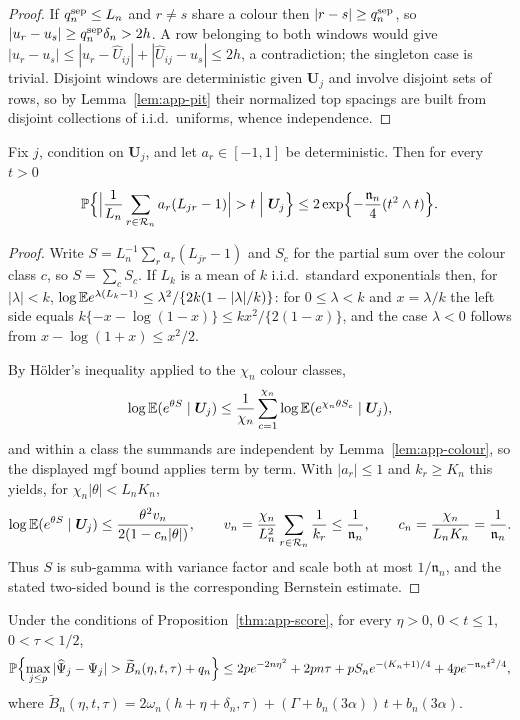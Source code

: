 \begin{proof}
If $q_n^{\rm sep}\le L_n$ and $r\ne s$ share a colour then
$|r-s|\ge q_n^{\rm sep}$, so $|u_r-u_s|\ge q_n^{\rm sep}\delta_n>2h$.
A row belonging to both windows would give
$|u_r-u_s|\le|u_r-\widehat U_{ij}|+|\widehat U_{ij}-u_s|\le2h$, a
contradiction; the singleton case is trivial.  Disjoint windows are
deterministic given $\bm U_j$ and involve disjoint sets of rows, so by
Lemma~\ref{lem:app-pit} their normalized top spacings are built from
disjoint collections of i.i.d.\ uniforms, whence independence.
\end{proof}

\begin{lemma}\label{lem:app-colourbern}
Fix $j$, condition on $\bm U_j$, and let $a_r\in[-1,1]$ be deterministic.
Then for every $t>0$
\[
 \Pp\Bigl\{\Bigl|\frac1{L_n}\sum_{r\in\mathcal R_n}a_r(L_{jr}-1)\Bigr|>t
 \;\Big|\;\bm U_j\Bigr\}
 \le2\exp\Bigl\{-\frac{\mathfrak n_n}{4}(t^2\wedge t)\Bigr\}.
\]
\end{lemma}

\begin{proof}
Write $S=L_n^{-1}\sum_ra_r(L_{jr}-1)$ and $S_c$ for the partial sum over
the colour class $c$, so $S=\sum_{c}S_c$.  If $L_k$ is a mean of $k$
i.i.d.\ standard exponentials then, for $|\lambda|<k$,
$\log\mathbb E e^{\lambda(L_k-1)}\le\lambda^2/\{2k(1-|\lambda|/k)\}$: for
$0\le\lambda<k$ and $x=\lambda/k$ the left side equals
$k\{-x-\log(1-x)\}\le kx^2/\{2(1-x)\}$, and the case $\lambda<0$ follows
from $x-\log(1+x)\le x^2/2$.

By H\"older's inequality applied to the $\chi_n$ colour classes,
\[
 \log\mathbb E(e^{\theta S}\mid\bm U_j)
 \le\frac1{\chi_n}\sum_{c=1}^{\chi_n}
   \log\mathbb E(e^{\chi_n\theta S_c}\mid\bm U_j),
\]
and within a class the summands are independent by
Lemma~\ref{lem:app-colour}, so the displayed mgf bound applies term by
term.  With $|a_r|\le1$ and $k_r\ge K_n$ this yields, for
$\chi_n|\theta|<L_nK_n$,
\[
 \log\mathbb E(e^{\theta S}\mid\bm U_j)
 \le\frac{\theta^2v_n}{2(1-c_n|\theta|)},
 \qquad
 v_n=\frac{\chi_n}{L_n^2}\sum_{r\in\mathcal R_n}\frac1{k_r}
 \le\frac1{\mathfrak n_n},
 \qquad
 c_n=\frac{\chi_n}{L_nK_n}=\frac1{\mathfrak n_n}.
\]
Thus $S$ is sub-gamma with variance factor and scale both at most
$1/\mathfrak n_n$, and the stated two-sided bound is the corresponding
Bernstein estimate.
\end{proof}

\begin{proposition}
\label{thm:app-score-na}
Under the conditions of Proposition~\ref{thm:app-score}, for every
$\eta>0$, $0<t\le1$, $0<\tau<1/2$,
\[
 \mathbb P\Bigl\{\max_{j\le p}|\widehat\Psi_j-\Psi_j|
 >\widetilde B_n(\eta,t,\tau)+q_n\Bigr\}
 \le2pe^{-2n\eta^2}+2pn\tau+pS_ne^{-(K_n+1)/4}
   +4pe^{-\mathfrak n_nt^2/4},
\]
where
$\widetilde B_n(\eta,t,\tau)
 =2\omega_n(h+\eta+\delta_n,\tau)+(\Gamma+b_n(3\alpha))\,t
 +b_n(3\alpha)$.
\end{proposition}

